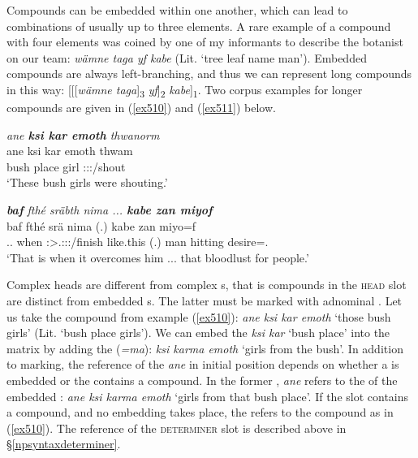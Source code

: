 Compounds can be embedded within one another, which can lead to combinations of usually up to three elements. A rare example of a compound with four elements was coined by one of my informants to describe the botanist on our team: \emph{wämne taga yf kabe} (Lit. `tree leaf name man'). Embedded compounds are always left-branching, and thus we can represent long compounds in this way: [[[\emph{wämne taga}]\textsubscript{3} \emph{yf}]\textsubscript{2} \emph{kabe}]\textsubscript{1}. Two corpus examples for longer compounds are given in (\ref{ex510}) and (\ref{ex511}) below.

\begin{exe}
 	\ex \emph{ane \textbf{ksi kar emoth} thwanorm}\\
 	\gll ane ksi kar emoth thwam\\
 	\Dem{} bush place girl \Stpl:\Sbj:\Pst:\Dur/shout\\
 	\trans `These bush girls were shouting.'
 	\label{ex510}
\end{exe}
\begin{exe}
 	\ex \emph{\textbf{baf} fthé sräbth nima ... \textbf{kabe zan miyof}}\\
 	\gll baf fthé srä nima (.) kabe zan miyo=f\\
 	\Recog.\Erg.\Sg{} when \Stsg:\Sbj>\Tsg.\Masc:\Obj:\Irr:\Pfv/finish like.this (.) man hitting desire=\Erg.\Sg\\
 	\trans `That is when it overcomes him ... that bloodlust for people.'\\
 	\label{ex511}
\end{exe}

Complex heads are different from complex s, that is compounds in the \textsc{head} slot are distinct from embedded s. The latter must be marked with adnominal . Let us take the compound from example (\ref{ex510}): \emph{ane ksi kar emoth} `those bush girls' (Lit. `bush place girls'). We can embed the  \emph{ksi kar} `bush place' into the matrix  by adding the   (\emph{=ma}): \emph{ksi karma emoth} `girls from the bush'. In addition to  marking, the reference of the  \emph{ane} in initial position depends on whether a  is embedded or the  contains a compound. In the former , \emph{ane} refers to the  of the embedded : \emph{ane ksi karma emoth} `girls from that bush place'. If the  slot contains a compound, and no embedding takes place, the  refers to the compound as in (\ref{ex510}). The reference of the \textsc{determiner} slot is described above in \S{}\ref{npsyntaxdeterminer}.%

